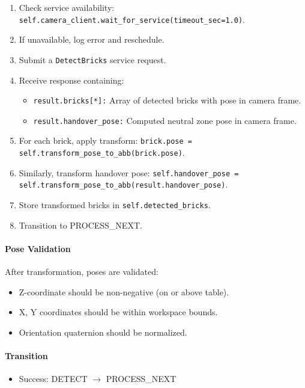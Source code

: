 \begin{enumerate}
    \item Check service availability: \texttt{self.camera\_client.wait\_for\_service(timeout\_sec=1.0)}.
    \item If unavailable, log error and reschedule.
    \item Submit a \texttt{DetectBricks} service request.
    \item Receive response containing:
    \begin{itemize}
        \item \texttt{result.bricks[*]:} Array of detected bricks with pose in camera frame.
        \item \texttt{result.handover\_pose:} Computed neutral zone pose in camera frame.
    \end{itemize}
    \item For each brick, apply transform: \texttt{brick.pose = self.transform\_pose\_to\_abb(brick.pose)}.
    \item Similarly, transform handover pose: \texttt{self.handover\_pose = self.transform\_pose\_to\_abb(result.handover\_pose)}.
    \item Store transformed bricks in \texttt{self.detected\_bricks}.
    \item Transition to PROCESS\_NEXT.
\end{enumerate}

\paragraph{Pose Validation}

After transformation, poses are validated:
\begin{itemize}
    \item Z-coordinate should be non-negative (on or above table).
    \item X, Y coordinates should be within workspace bounds.
    \item Orientation quaternion should be normalized.
\end{itemize}

\paragraph{Transition}

\begin{itemize}
    \item Success: DETECT $\rightarrow$ PROCESS\_NEXT
\end{itemize}

